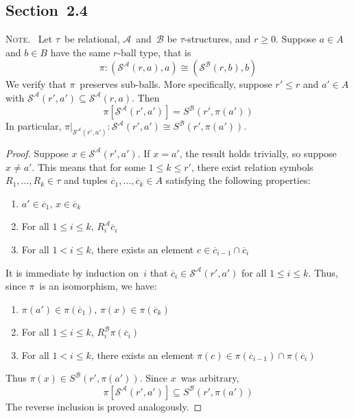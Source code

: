 \documentclass[letterpaper]{article}
\newcommand{\A}{\mathcal{A}}
\newcommand{\B}{\mathcal{B}}
\renewcommand{\S}{\mathcal{S}}
\newcommand{\obar}[1]{\overline{#1}}
\newcommand{\iso}{\cong}
\newcommand{\sect}{\cap}
\newcommand{\booksection}[1]{\subsection*{Section~{#1}}}
\newcommand{\note}{\noindent\textsc{Note.}\ }
\theoremstyle{plain}
\begin{document}
\booksection{2.4}
\note
Let $\tau$~be relational, $\A$~and~$\B$ be $\tau$-structures, and $r\ge0$. Suppose $a\in A$ and $b\in B$ have the same $r$-ball type, that is
$$\pi:(\S^{\A}(r,a),a)\iso(\S^{\B}(r,b),b)$$
We verify that $\pi$~preserves sub-balls. More specifically, suppose $r'\le r$ and $a'\in A$ with $\S^{\A}(r',a')\subseteq\S^{\A}(r,a)$. Then
$$\pi[\S^{\A}(r',a')]=S^{\B}(r',\pi(a'))$$
In particular, $\pi|_{\S^{\A}(r',a')}:\S^{\A}(r',a')\iso S^{\B}(r',\pi(a'))$.
\begin{proof}
Suppose $x\in\S^{\A}(r',a')$. If $x=a'$, the result holds trivially, so suppose $x\ne a'$. This means that for some $1\le k\le r'$, there exist relation symbols $R_1,\ldots,R_k\in\tau$ and tuples $\obar{c}_1,\ldots,\obar{c}_k\in A$ satisfying the following properties:
\begin{enumerate}[itemsep=0pt]
\item $a'\in\obar{c}_1$, $x\in\obar{c}_k$
\item For all $1\le i\le k$, $R_i^{\A}\obar{c}_i$
\item For all $1<i\le k$, there exists an element $c\in\obar{c}_{i-1}\sect\obar{c}_i$
\end{enumerate}
It is immediate by induction on~$i$ that $\obar{c}_i\in\S^{\A}(r',a')$ for all $1\le i\le k$. Thus, since $\pi$~is an isomorphism, we have:
\begin{enumerate}[itemsep=0pt]
\item $\pi(a')\in\pi(\obar{c}_1)$, $\pi(x)\in\pi(\obar{c}_k)$
\item For all $1\le i\le k$, $R_i^{\B}\pi(\obar{c}_i)$
\item For all $1<i\le k$, there exists an element $\pi(c)\in\pi(\obar{c}_{i-1})\sect\pi(\obar{c}_i)$	
\end{enumerate}
Thus $\pi(x)\in S^{\B}(r',\pi(a'))$. Since $x$~was arbitrary,
$$\pi[\S^{\A}(r',a')]\subseteq S^{\B}(r',\pi(a'))$$
The reverse inclusion is proved analogously.
\end{proof}
\end{document}
